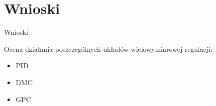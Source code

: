 \section{Wnioski}
\begin{frame}{Wnioski}

Ocena działania poszczególnych układów wielowymiarowej regulacji:
\begin{itemize}
    \item PID
    \item DMC
    \item GPC
\end{itemize}

\end{frame}